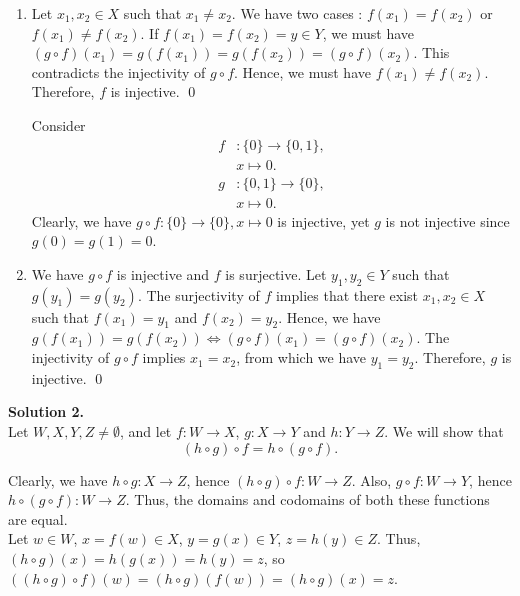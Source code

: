 \documentclass[10pt]{article}
\begin{document}
\begin{enumerate}
                \item Let $x_1, x_2 \in X$ such that $x_1 \neq x_2$. We have two cases : $f(x_1) = f(x_2)$ or $f(x_1) \neq f(x_2)$.
                If $f(x_1) = f(x_2) = y \in Y$, we must have $(g\circ f)(x_1) = g(f(x_1)) = g(f(x_2)) = (g\circ f)(x_2)$.
                This contradicts the injectivity of $g\circ f$. Hence, we must have $f(x_1) \neq f(x_2)$.
                Therefore, $f$ is injective. \qed

                Consider
                \begin{align*}
                        f &: \{0\}  \to \{0, 1\},\\
                        &x \mapsto 0.\\
                        g &: \{0, 1\} \to \{0\},\\
                        &x \mapsto 0.
                \end{align*}
                Clearly, we have $g\circ f: \{0\} \to \{0\}, x\mapsto 0$ is injective, yet $g$ is not injective since 
                $g(0) = g(1) = 0$.

                \item We have $g\circ f$ is injective and $f$ is surjective.
                Let $y_1, y_2 \in Y$ such that $g(y_1) = g(y_2)$. The surjectivity of $f$ implies that there exist $x_1, x_2 \in X$
                such that $f(x_1) = y_1$ and $f(x_2) = y_2$. Hence, we have $g(f(x_1)) = g(f(x_2)) \Leftrightarrow (g\circ f)(x_1) = (g\circ f)(x_2)$.
                The injectivity of $g\circ f$ implies $x_1 = x_2$, from which we have $y_1 = y_2$.
                Therefore, $g$ is injective. \qed
        \end{enumerate}
        
        \textbf{Solution 2.}\\ 
        Let $W, X, Y, Z \neq \emptyset$, and let $f: W\to X$, $g: X\to Y$ and $h: Y\to Z$. We will show that $$(h\circ g)\circ f = h\circ (g\circ f).$$

        Clearly, we have $h\circ g: X \to Z$, hence $(h \circ g)\circ f: W \to Z$. Also, $g\circ f: W\to Y$, hence $h\circ (g\circ f): W \to Z$.
        Thus, the domains and codomains of both these functions are equal.\\

        Let $w \in W$, $x = f(w) \in X$, $y = g(x) \in Y$, $z = h(y) \in Z$. Thus, $(h\circ g)(x) = h(g(x)) = h(y) = z$, so 
        $((h\circ g)\circ f)(w) = (h\circ g)(f(w)) = (h\circ g)(x) = z$.
\end{document}
